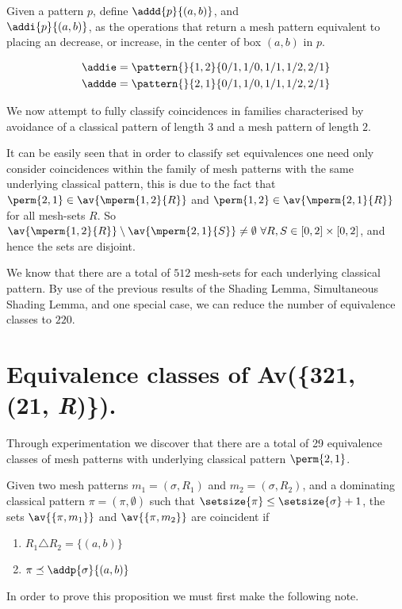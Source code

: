 \begin{definition}
    Given a pattern \(p\), define \(\addd{p}{(a,b)}\), and \\ \(\addi{p}{(a,b)}\),
    as the operations that return a mesh pattern equivalent to placing an
    decrease, or increase, in the center of box \((a,b)\) in \(p\).
\end{definition}

\begin{example}
    \begin{align*}
        \addie = \pattern{}{1,2}{0/1,1/0,1/1,1/2,2/1}\\
        \addde = \pattern{}{2,1}{0/1,1/0,1/1,1/2,2/1}
    \end{align*}
\end{example}

We now attempt to fully classify coincidences in families characterised by avoidance
of a classical pattern of length \(3\) and a mesh pattern of length \(2\).

It can be easily seen that in order to classify set equivalences one need only
consider coincidences within the family of mesh patterns with the same underlying
classical pattern, this is due to the fact that \(\perm{2,1}\in\av{\mperm{1,2}{R}}\)
and \(\perm{1,2}\in\av{\mperm{2,1}{R}}\) for all mesh-sets \(R\). So
\(\av{\mperm{1,2}{R}}\setminus \av{\mperm{2,1}{S}}\neq \emptyset\ \forall
R,S\in [0,2]\times [0,2]\), and hence the sets are disjoint.

We know that there are a total of \(512\) mesh-sets for each underlying classical
pattern. By use of the previous results of the Shading
Lemma\cite[Lemma~3.11]{DBLP:journals/combinatorics/HilmarssonJSVU15},
Simultaneous Shading Lemma\cite[Lemma~7.6]{DBLP:journals/corr/ClaessonTU14}, and
one special case, we can reduce the number of equivalence classes to \(220\).

\section{Equivalence classes of Av(\{321, (21, \textit{R})\}).}
Through experimentation we discover that there are a total of 29 equivalence
classes of mesh patterns with underlying classical pattern \(\perm{2,1}\).

\begin{proposition}
    \label{prop:dom1}
    Given two mesh patterns \(m_1 =(\sigma, R_1)\) and \(m_2 = (\sigma, R_2)\),
    and a dominating classical pattern \(\pi = (\pi,\emptyset)\) such that
    \(\setsize{\pi} \le \setsize{\sigma} + 1\), the sets \(\av{\{\pi,m_1\}}\) and
    \(\av{\{\pi,m_2\}}\) are coincident if

    \begin{enumerate}
        \item \(R_1 \triangle R_2 = \{(a,b)\}\)
        \item \(\pi \preceq \addp{\sigma}{(a,b)}\)\label{prop:dom1:cont}
    \end{enumerate}
\end{proposition}
In order to prove this proposition we must first make the following note.

